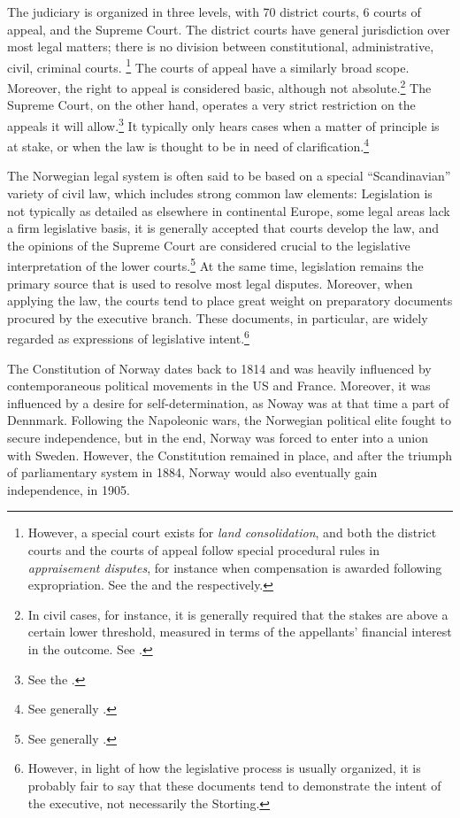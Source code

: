 The judiciary is organized in three levels, with 70 district courts, 6 courts of appeal, and the Supreme Court. The district courts have general jurisdiction over most legal matters; there is no division between constitutional, administrative, civil, criminal courts. \footnote{However, a special court exists for {\it land consolidation}, and both the district courts and the courts of appeal follow special procedural rules in {\it appraisement disputes}, for instance when compensation is awarded following expropriation. See the \cite{lca79} and the \cite{aa17} respectively.} The courts of appeal have a similarly broad scope. Moreover, the right to appeal is considered basic, although not absolute.\footnote{In civil cases, for instance, it is generally required that the stakes are above a certain lower threshold, measured in terms of the appellants' financial interest in the outcome. See \cite[29-13]{da05}.}  The Supreme Court, on the other hand, operates a very strict restriction on the appeals it will allow.\footnote{See the \cite[30-4]{da05}.} It typically only hears cases when a matter of principle is at stake, or when the law is thought to be in need of clarification.\footnote{See generally \cite{skoghoy08}.}

The Norwegian legal system is often said to be based on a special ``Scandinavian'' variety of civil law, which includes strong common law elements: Legislation is not typically as detailed as elsewhere in continental Europe, some legal areas lack a firm legislative basis,  it is generally accepted that courts develop the law, and the opinions of the Supreme Court are considered crucial to the legislative interpretation of the lower courts.\footnote{See generally \cite{bernitz07}.} At the same time, legislation remains the primary source that is used to resolve most legal disputes. Moreover, when applying the law, the courts tend to place great weight on preparatory documents procured by the executive branch. These documents, in particular, are widely regarded as expressions of legislative intent.\footnote{However, in light of how the legislative process is usually organized, it is probably fair to say that these documents tend to demonstrate the intent of the executive, not necessarily the Storting.}

The Constitution of Norway dates back to 1814 and was heavily influenced by contemporaneous political movements in the US and France. Moreover, it was influenced by a desire for self-determination, as Noway was at that time a part of Dennmark. Following the Napoleonic wars, the Norwegian political elite fought to secure independence, but in the end, Norway was forced to enter into a union with Sweden. However, the Constitution remained in place, and after the triumph of parliamentary system in 1884, Norway would also eventually gain independence, in 1905.

